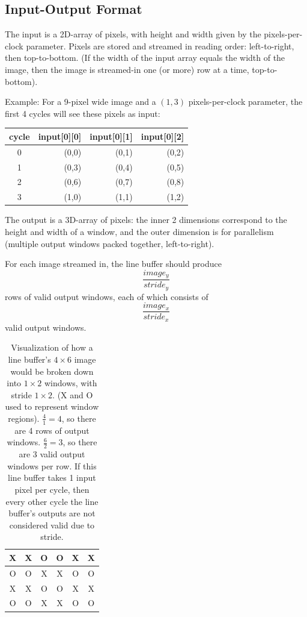 \documentclass[12pt]{article}
\begin{document}
\subsection{Input-Output Format}

The input is a 2D-array of pixels, with height and width given by the
pixels-per-clock parameter. Pixels are stored and streamed in reading
order: left-to-right, then top-to-bottom. (If the width of the input
array equals the width of the image, then the image is streamed-in one
(or more) row at a time, top-to-bottom).

Example: For a 9-pixel wide image and a $(1,3)$ pixels-per-clock
parameter, the first 4 cycles will see these pixels as input:

\begin{center}
\begin{tabular}{c|r r r}
cycle & input[0][0] & input[0][1] & input[0][2] \\
\hline
0 & (0,0) & (0,1) & (0,2) \\
1 & (0,3) & (0,4) & (0,5) \\
2 & (0,6) & (0,7) & (0,8) \\
\hline
3 & (1,0) & (1,1) & (1,2)
\end{tabular}
\end{center}

The output is a 3D-array of pixels: the inner 2 dimensions correspond
to the height and width of a window, and the outer dimension is for
parallelism (multiple output windows packed together, left-to-right).

For each image streamed in, the line buffer should produce
\begin{equation}
\frac{image_y}{stride_y}
\end{equation}
rows of valid output windows, each of which consists of
\begin{equation}
\frac{image_x}{stride_x}
\end{equation}
valid output windows.

\begin{table}
\centering
\begin{tabular}{| c c | c c | c c |}
\hline
X & X & O & O & X & X \\
\hline
O & O & X & X & O & O \\
\hline
X & X & O & O & X & X \\
\hline
O & O & X & X & O & O \\
\hline
\end{tabular}

\caption{
Visualization of how a line buffer's $4 \times 6$ image would be
broken down into $1 \times 2$ windows, with stride $1 \times 2$. (X
and O used to represent window regions). $\frac{4}{1} = 4$, so there
are 4 rows of output windows. $\frac{6}{2} = 3$, so there are 3 valid
output windows per row. If this line buffer takes 1 input pixel per
cycle, then every other cycle the line buffer's outputs are not
considered valid due to stride.}
\end{table}
\end{document}
